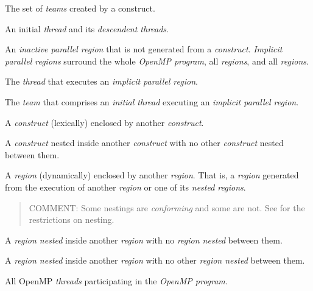 \glossarydefstart
The set of \emph{teams} created by a  construct.
\glossarydefend

\glossarydefstart
An initial \emph{thread} and its \emph{descendent threads}.
\glossarydefend

\glossarydefstart
An \emph{inactive parallel region} that is not generated from a
 \emph{construct}. \emph{Implicit parallel regions} 
surround the whole \emph{OpenMP program}, all  
\emph{regions}, and all  \emph{regions}.

\glossarydefend

\glossarydefstart
The \emph{thread} that executes an \emph{implicit parallel region}.
\glossarydefend

\glossarydefstart
The \emph{team} that comprises an \emph{initial thread} executing 
an \emph{implicit parallel region}.
\glossarydefend

\glossarydefstart
A \emph{construct} (lexically) enclosed by another \emph{construct}.
\glossarydefend

\glossarydefstart
A \emph{construct} nested inside another \emph{construct} with no 
other \emph{construct} nested between them.
\glossarydefend

\glossarydefstart
A \emph{region} (dynamically) enclosed by another \emph{region}.  That is, a
\emph{region} generated from the execution of another \emph{region}
or one of its \emph{nested regions}.

\begin{quote}
COMMENT: Some nestings are \emph{conforming} and some are not.
See  for the restrictions on nesting.
\end{quote}
\glossarydefend

\glossarydefstart
A \emph{region nested} inside another \emph{region} with no  
\emph{region nested} between them.
\glossarydefend

\glossarydefstart
A \emph{region nested} inside another \emph{region} with no other 
\emph{region nested} between them.
\glossarydefend

\glossarydefstart
All OpenMP \emph{threads} participating in the \emph{OpenMP program}.
\glossarydefend

